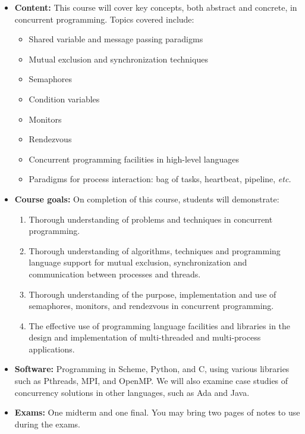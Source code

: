 \documentclass{article}
\begin{document}
\begin{itemize}
\item
{\bf Content:}
This course will cover key concepts, both abstract and concrete, in
concurrent programming.  Topics covered include:
\begin{multicols}{2}
\begin{itemize}
\item Shared variable and message passing paradigms
\item Mutual exclusion and synchronization techniques
\item Semaphores 
\item Condition variables
\item Monitors 
\item Rendezvous 
\item Concurrent programming facilities in high-level languages
\item Paradigms for process interaction:  bag of tasks, heartbeat,
  pipeline, {\em etc.}
\end{itemize}
\end{multicols}
\item
{\bf Course goals:}
On completion of this course, students will demonstrate: 
\begin{multicols}{2}
  \begin{enumerate}
  \item Thorough understanding of problems and techniques in
    concurrent programming.
\item Thorough understanding of algorithms, techniques and programming
  language support for mutual exclusion, synchronization and
  communication between processes and threads.
\item Thorough understanding of the purpose, implementation and use of
  semaphores, monitors, and rendezvous in concurrent programming.
\item The effective use of programming language facilities and
  libraries in the design and implementation of multi-threaded and
  multi-process applications.

  \end{enumerate}
\end{multicols}
\item {\bf Software:} Programming in Scheme, Python, and C, using
  various libraries such as Pthreads, MPI, and OpenMP.  We will also
  examine case studies of concurrency solutions in other languages,
  such as Ada and Java.

\item {\bf Exams:}   One
  midterm and one final.  You may bring two pages of notes to use
  during the exams.


\end{itemize}
\end{document}

